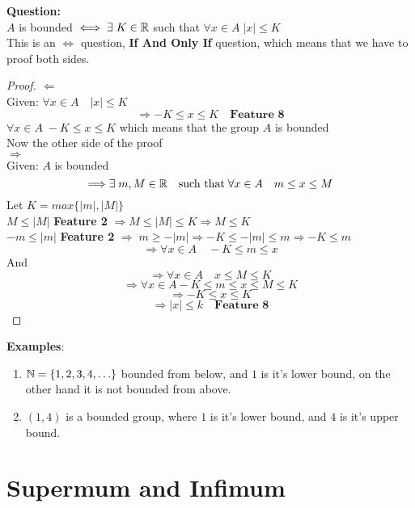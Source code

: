 \noindent \textbf{Question:}\\
$A$ is bounded $\iff \exists \; K\in \mathbb{R}$ such that $\forall x\in A \; |x|\leq K$\\
This is an $\iff$ question, \textbf{If And Only If} question, which means that we have to proof both sides.
\begin{proof}
    
    $\Longleftarrow$\\
    Given: $\forall x\in A \quad|x|\leq K$\\
    \[
        \Longrightarrow -K\leq x\leq K \quad\textbf{Feature 8}
    \]
    $\forall x\in A \; -K\leq x\leq K$ which means that the group $A$ is bounded\\
    Now the other side of the proof\\
    $\Longrightarrow$\\
    Given: $A$ is bounded\\
    \[
        \Longrightarrow \exists \; m,M \in \mathbb{R} \quad\text{such that}\; \forall x\in A \quad m\leq x\leq M
    \]
    Let $K = max\{|m|,|M|\}$\\
    $M \leq |M|$ \textbf{Feature 2} $\Longrightarrow M\leq |M|\leq K \Longrightarrow M\leq K$\\
    $-m \leq |m|$ \textbf{Feature 2} $\Longrightarrow \; m\geq -|m| \Longrightarrow -K\leq -|m| \leq m\Longrightarrow -K\leq m$\\
    \[
        \Longrightarrow \forall x\in A \quad -K\leq m\leq x
    \]
    And\\
    \[
        \Longrightarrow \forall x\in A \quad x\leq M\leq K
    \]
    \[
        \Longrightarrow \forall x\in A -K\leq m\leq x\leq M\leq K
    \]
    \[
        \Longrightarrow -K\leq x\leq K
    \]
    \[
        \Longrightarrow |x|\leq k \quad \textbf{Feature 8}
    \]
\end{proof}
\noindent \textbf{Examples}\;:\\
\begin{enumerate}
    \item $\mathbb{N} = \{1,2,3,4,\ldots\}$ bounded from below, and $1$ is it's lower bound, on the other hand it is not bounded from above.\\
    \item $(1,4)$ is a bounded group, where $1$ is it's lower bound, and $4$ is it's upper bound.\\

\end{enumerate}


\section{Supermum and Infimum}
